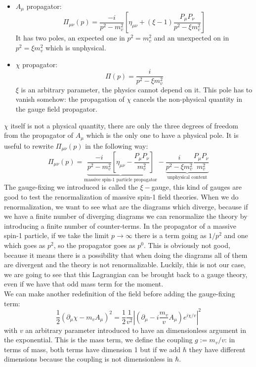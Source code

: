 \documentclass[../main.tex]{subfiles}
\begin{document}
\begin{itemize}
    \item $A_\mu$ propagator:
    \[
    \Pi_{\mu\nu}(p)=\frac{-i}{p^2-m_v^2}\left[\eta_{\mu\nu}+(\xi-1)\frac{P_\mu P_\nu}{p^2-\xi m_v^2}\right]
    \]
    It has two poles, an expected one in $p^2=m_v^2$ and an unexpected on in $p^2=\xi m_v^2$ which is unphysical.
    \item $\chi$ propagator:
    \[
    \Pi(p)=\frac{i}{p^2-\xi m_v^2}
    \]
    $\xi$ is an arbitrary parameter, the physics cannot depend on it. This pole has to vanish somehow: the propagation of $\chi$ cancels the non-physical quantity in the gauge field propagator. 
\end{itemize}
$\chi$ itself is not a physical quantity, there are only the three degrees of freedom from the propagator of $A_\mu$ which is the only one to have a physical pole. It is useful to rewrite $\Pi_{\mu\nu}(p)$ in the following way:
\[
\Pi_{\mu\nu}(p)=\underbrace{\frac{-i}{p^2-m_v^2}\left[\eta_{\mu\nu}-\frac{P_\mu P_\nu}{m_v^2}\right]}_{\text{massive spin-1 particle propagator}}-\underbrace{\frac{i}{p^2-\xi m_v^2}\frac{P_\mu P_\nu}{m_v^2}}_{\text{unphysical content}}
\]
The gauge-fixing we introduced is called the $\xi-$gauge, this kind of gauges are good to test the renormalization of massive spin-1 field theories. When we do renormalization, we want to see what are the diagrams which diverge, because if we have a finite number of diverging diagrams we can renormalize the theory by introducing a finite number of counter-terms. In the propagator of a massive spin-1 particle, if we take the limit $p\to\infty$ there is a term going as $1/p^2$ and one which goes as $p^2$, so the propagator goes as $p^0$. This is obviously not good, because it means there is a possibility that when doing the diagrams all of them are divergent and the theory is not renormalizable. Luckily, this is not our case, we are going to see that this Lagrangian can be brought back to a gauge theory, even if we have that odd mass term for the moment.\\
We can make another redefinition of the field before adding the gauge-fixing term:
\[
\frac{1}{2}(\partial_\mu\chi-m_vA_\mu)^2=\frac{1}{2}\frac{1}{v^2}\left|\left(\partial_\mu-i\frac{m_v}{v}A_\mu\right)e^{i\chi/v}\right|^2
\]
with $v$ an arbitrary parameter introduced to have an dimensionless argument in the exponential. This is the mass term, we define the coupling $g:=m_v/v$: in terms of mass, both terms have dimension 1 but if we add $\hbar$ they have different dimensions because the coupling is not dimensionless in $\hbar$.
\end{document}
